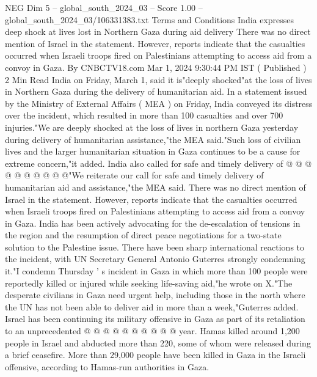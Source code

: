 \begin{textsample}{NEG Dim 5 – global\_south\_2024\_03 – Score 1.00 – global\_south\_2024\_03/106331383.txt}  \label{ex:f5_neg_203}
Terms and Conditions India expresses deep shock at lives lost in Northern Gaza during aid delivery There was no direct mention of Israel in the statement.
However, reports indicate that the casualties occurred when Israeli troops fired on Palestinians attempting to access aid from a convoy in Gaza.
By CNBCTV18.com Mar 1, 2024 9:30:44 PM IST ( Published ) 2 Min Read India on Friday, March 1, said it is"deeply shocked"at the loss of lives in Northern Gaza during the delivery of humanitarian aid.
In a statement issued by the Ministry of External Affairs ( MEA ) on Friday, India conveyed its distress over the incident, which resulted in more than 100 casualties and over 700 injuries."We are deeply shocked at the loss of lives in northern Gaza yesterday during delivery of humanitarian assistance,"the MEA said."Such loss of civilian lives and the larger humanitarian situation in Gaza continues to be a cause for extreme concern,"it added.
India also called for safe and timely delivery of @ @ @ @ @ @ @ @ @ @"We reiterate our call for safe and timely delivery of humanitarian aid and assistance,"the MEA said.
There was no direct mention of Israel in the statement.
However, reports indicate that the casualties occurred when Israeli troops fired on Palestinians attempting to access aid from a convoy in Gaza.
India has been actively advocating for the de-escalation of tensions in the region and the resumption of direct peace negotiations for a two-state solution to the Palestine issue.
There have been sharp international reactions to the incident, with UN Secretary General Antonio Guterres strongly condemning it."I condemn Thursday ' s incident in Gaza in which more than 100 people were reportedly killed or injured while seeking life-saving aid,"he wrote on X."The desperate civilians in Gaza need urgent help, including those in the north where the UN has not been able to deliver aid in more than a week,"Guterres added.
Israel has been continuing its military offensive in Gaza as part of its retaliation to an unprecedented @ @ @ @ @ @ @ @ @ @ year.
Hamas killed around 1,200 people in Israel and abducted more than 220, some of whom were released during a brief ceasefire.
More than 29,000 people have been killed in Gaza in the Israeli offensive, according to Hamas-run authorities in Gaza.

\end{textsample}
